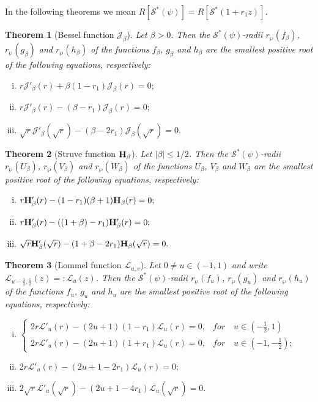 \documentclass[12pt, reqno]{amsart}
\numberwithin{equation}{section}
\theoremstyle{plain}
\newtheorem{theorem}{Theorem}[section]
\theoremstyle{definition}
\theoremstyle{remark}
\begin{document}
In the following theorems we mean $R[\mathcal{S}^{*}(\psi)] = R[\mathcal{S}^{*}(1+r_1 z)]$.	
\begin{theorem}[Bessel function $\mathcal{J}_{\beta}$]\label{gbessel}
	Let $\beta>0$. Then the $\mathcal{S}^*(\psi)$-radii $r_{\wp}(f_{\beta})$, $r_{\wp}(g_{\beta})$ and $r_{\wp}(h_{\beta})$ of the functions $f_{\beta}$, $g_{\beta}$ and $h_{\beta}$ are the smallest positive root of the following equations, respectively:
	\begin{enumerate}[(i)]
		\item $r\mathcal{J}'_{\beta}(r)+\beta(1-{r_1})\mathcal{J}_{\beta}(r)=0;$
		\item $r\mathcal{J}'_{\beta}(r)-(\beta-{r_1})\mathcal{J}_{\beta}(r)=0;$
		\item $\sqrt{r}\mathcal{J}'_{\beta}(\sqrt{r})-(\beta-2{r_1})\mathcal{J}_{\beta}(\sqrt{r})=0.$
	\end{enumerate}	
\end{theorem}
\begin{theorem}[Struve function $\mathcal{\bf{H}}_{\beta}$]\label{gstruve}
	Let $|\beta|\leq {1}/{2}$. Then the $\mathcal{S}^*(\psi)$-radii $r_{\wp}(U_{\beta})$, $r_{\wp}(V_{\beta})$ and $r_{\wp}(W_{\beta})$ of the functions $U_{\beta}$, $V_{\beta}$ and $W_{\beta}$ are the smallest positive root of the following equations, respectively:
	\begin{enumerate}[(i)]
		\item $r{\bf{H}}'_{\beta}(r)-(1-{r_1})(\beta+1){\bf{H}}_{\beta}(r)=0;$
		\item $r{\bf{H}}'_{\beta}(r)-((1+\beta)-{r_1}){\bf{H}}'_{\beta}(r)=0;$
		\item $\sqrt{r}{\bf{H}}'_{\beta}(\sqrt{r})-(1+\beta-2{r_1}){\bf{H}}_{\beta}(\sqrt{r})=0.$
	\end{enumerate}
\end{theorem}
\begin{theorem}[Lommel function $\mathcal{L}_{u,v}$]\label{glommel}
	Let $0\neq u\in(-1,1)$ and write $\mathcal{L}_{u-\tfrac{1}{2}, \tfrac{1}{2}}(z)=:\mathcal{L}_{u}(z)$. Then the $\mathcal{S}^*(\psi)$-radii $r_{\wp}(f_{u})$, $r_{\wp}(g_{u})$ and $r_{\wp}(h_{u})$ of the functions $f_{u}$, $g_{u}$ and $h_{u}$ are the smallest positive root of the following equations, respectively:
	\begin{enumerate}[(i)]
		\item $\left\{
		\begin{array}
		{ll}
		2r\mathcal{L}'_{u}(r)-(2u+1)(1-{r_1})\mathcal{L}_{u}(r)=0,     & for\quad u\in(-\frac{1}{2},1) \\
		2r\mathcal{L}'_{u}(r)-(2u+1)(1+{r_1})\mathcal{L}_{u}(r)=0, & for\quad u\in(-1,-\frac{1}{2});
		\end{array}
		\right.$
		
		\item $2r\mathcal{L}'_{u}(r)-(2u+1-2{r_1})\mathcal{L}_{u}(r)=0;$
		\item $2\sqrt{r}\mathcal{L}'_{u}(\sqrt{r})-(2u+1-4{r_1})\mathcal{L}_{u}(\sqrt{r})=0.$
	\end{enumerate}	
\end{theorem}
\end{document}
